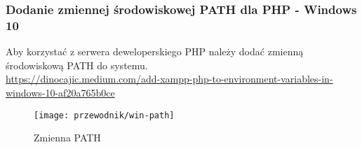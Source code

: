         \subsubsection{Dodanie zmiennej środowiskowej PATH dla PHP - Windows 10}
        Aby korzystać z serwera deweloperskiego PHP należy dodać zmienną środowiskową PATH do systemu.\\
        \url{https://dinocajic.medium.com/add-xampp-php-to-environment-variables-in-windows-10-af20a765b0ce} \\
        \begin{figure}[!htb]
            \centering
            \texttt{[image: przewodnik/win-path]}
            \caption{Zmienna PATH}                
        \end{figure}


